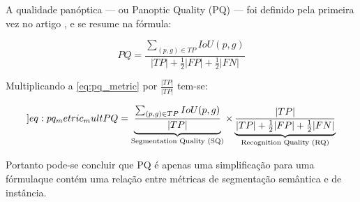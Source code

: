 
A qualidade panóptica — ou Panoptic Quality (PQ) — foi definido pela primeira vez no artigo , e se resume na fórmula:

\begin{equation}
\label{eq:pq_metric}
PQ = \frac{\sum_{(p,g)\in TP}IoU(p,g)}{ |TP| + \frac{1}{2}|FP| + \frac{1}{2}|FN|}
\end{equation}

Multiplicando a \cref{eq:pq_metric} por $\frac{|TP|}{|TP|}$ tem-se:

\begin{equation}
	\label[]{eq:pq_metric_mult}
	PQ = \underbrace{\frac{\sum_{(p,g)\in TP}IoU(p,g)}{|TP|}}_{\text{Segmentation Quality (SQ)}} 
	\times
	\underbrace{\frac{|TP|}{|TP| + \frac{1}{2}|FP| + \frac{1}{2}|FN|}}_{\text{Recognition Quality (RQ)}}
\end{equation}

Portanto pode-se concluir que PQ é apenas uma simplificação para uma fórmulaque contém uma relação entre métricas de segmentação semântica e de instância.


